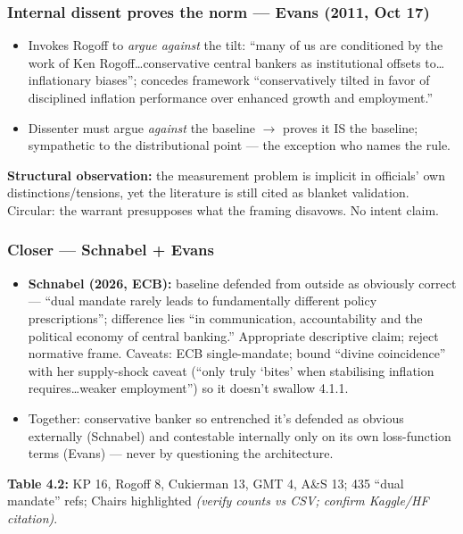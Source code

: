 \documentclass[12pt,a4paper]{article}
\begin{document}
\begin{doublespace}
\subsubsection{Internal dissent proves the norm --- Evans (2011, Oct 17)}
\begin{itemize}
    \item Invokes Rogoff to \textit{argue against} the tilt: ``many of us are conditioned by the work of Ken Rogoff\ldots conservative central bankers as institutional offsets to\ldots inflationary biases''; concedes framework ``conservatively tilted in favor of disciplined inflation performance over enhanced growth and employment.''
    \item Dissenter must argue \textit{against} the baseline $\rightarrow$ proves it IS the baseline; sympathetic to the distributional point --- the exception who names the rule.
\end{itemize}

\textbf{Structural observation:} the measurement problem is implicit in officials' own distinctions/tensions, yet the literature is still cited as blanket validation. Circular: the warrant presupposes what the framing disavows. No intent claim.

\subsubsection{Closer --- Schnabel + Evans}
\begin{itemize}
    \item \textbf{Schnabel (2026, ECB):} baseline defended from outside as obviously correct --- ``dual mandate rarely leads to fundamentally different policy prescriptions''; difference lies ``in communication, accountability and the political economy of central banking.'' Appropriate descriptive claim; reject normative frame. Caveats: ECB single-mandate; bound ``divine coincidence'' with her supply-shock caveat (``only truly `bites' when stabilising inflation requires\ldots weaker employment'') so it doesn't swallow 4.1.1.
    \item Together: conservative banker so entrenched it's defended as obvious externally (Schnabel) and contestable internally only on its own loss-function terms (Evans) --- never by questioning the architecture.
\end{itemize}

\textbf{Table 4.2:} KP 16, Rogoff 8, Cukierman 13, GMT 4, A\&S 13; 435 ``dual mandate'' refs; Chairs highlighted \textit{(verify counts vs CSV; confirm Kaggle/HF citation)}.


\end{doublespace}
\end{document}
